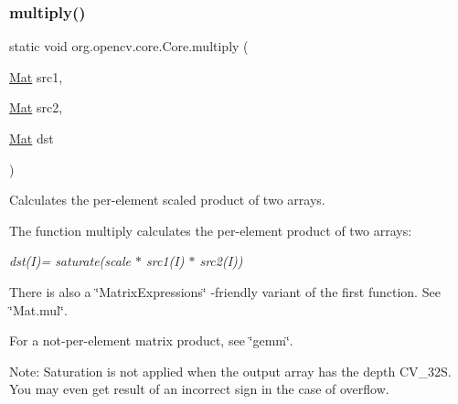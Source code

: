 \subsubsection{\texorpdfstring{multiply()}{multiply()}\hspace{0.1cm}{\footnotesize\ttfamily [3/6]}}
{\footnotesize\ttfamily static void org.\+opencv.\+core.\+Core.\+multiply (\begin{DoxyParamCaption}\item[{\mbox{\hyperlink{classorg_1_1opencv_1_1core_1_1_mat}{Mat}}}]{src1,  }\item[{\mbox{\hyperlink{classorg_1_1opencv_1_1core_1_1_mat}{Mat}}}]{src2,  }\item[{\mbox{\hyperlink{classorg_1_1opencv_1_1core_1_1_mat}{Mat}}}]{dst }\end{DoxyParamCaption})\hspace{0.3cm}{\ttfamily [static]}}

Calculates the per-\/element scaled product of two arrays.

The function {\ttfamily multiply} calculates the per-\/element product of two arrays\+:

{\itshape dst(\+I)= saturate(scale $\ast$ src1(\+I) $\ast$ src2(\+I))}

There is also a \char`\"{}\+Matrix\+Expressions\char`\"{} -\/friendly variant of the first function. See \char`\"{}\+Mat.\+mul\char`\"{}.

For a not-\/per-\/element matrix product, see \char`\"{}gemm\char`\"{}.

Note\+: Saturation is not applied when the output array has the depth {\ttfamily C\+V\+\_\+32S}. You may even get result of an incorrect sign in the case of overflow.


